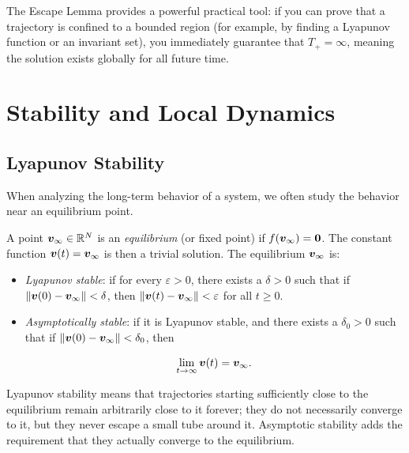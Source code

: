 \begin{remark}
The Escape Lemma provides a powerful practical tool: if you can prove that a trajectory is confined to a bounded region (for example, by finding a Lyapunov function or an invariant set), you immediately guarantee that $T_+ = \infty$, meaning the solution exists globally for all future time.
\end{remark}

\section{Stability and Local Dynamics}

\subsection{Lyapunov Stability}

When analyzing the long-term behavior of a system, we often study the behavior near an equilibrium point.

\begin{definition}
A point $\bm{v}_\infty \in \mathbb{R}^N$ is an \textit{equilibrium} (or fixed point) if $f(\bm{v}_\infty) = \mathbf{0}$. The constant function $\bm{v}(t) = \bm{v}_\infty$ is then a trivial solution.
The equilibrium $\bm{v}_\infty$ is:
\begin{itemize}
\item \textit{Lyapunov stable}: if for every $\varepsilon > 0$, there exists a $\delta > 0$ such that if $\|\bm{v}(0) - \bm{v}_\infty\| < \delta$, then $\|\bm{v}(t) - \bm{v}_\infty\| < \varepsilon$ for all $t \geq 0$.
\item \textit{Asymptotically stable}: if it is Lyapunov stable, and there exists a $\delta_0 > 0$ such that if $\|\bm{v}(0) - \bm{v}_\infty\| < \delta_0$, then

\[
\lim_{t \to \infty} \bm{v}(t) = \bm{v}_\infty.
\]

\end{itemize}
\end{definition}

\begin{remark}
Lyapunov stability means that trajectories starting sufficiently close to the equilibrium remain arbitrarily close to it forever; they do not necessarily converge to it, but they never escape a small tube around it. Asymptotic stability adds the requirement that they actually converge to the equilibrium.
\end{remark}

